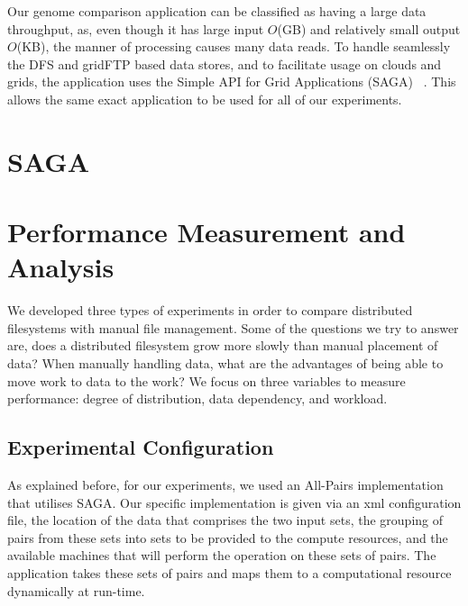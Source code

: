 \documentclass{rspublic}
\newcommand{\micnote}[1]{ {\textcolor{blue} { ***Michael: #1 }}} \else
\newcommand{\jhanote}[1]{} \newcommand{\micnote}[1]{} \newcommand{\fixme}[1]{}
\begin{document}

Our genome comparison application can be classified as having a large
data throughput, as, even though it
has large input $O$(GB) and relatively small output $O$(KB), the manner of 
processing causes many data reads.  To
handle seamlessly the DFS and gridFTP based data stores, and to 
facilitate usage on clouds and grids, the application
uses the Simple API for Grid Applications (SAGA) ~\citep{saga_web}.
This allows the same exact application to be used for all of our
experiments.  

\section{SAGA} \label{Sec:SAGA}

\section{Performance Measurement and Analysis} 
We developed three types
of experiments in order to compare distributed filesystems with manual
file management.  Some of the questions we try to answer are, 
does a distributed filesystem grow more slowly than
manual placement of data?  When manually handling data, what are the
advantages of being able to move work to data to the work?  
We focus on three variables to measure performance:  degree of distribution, data
dependency, and workload.

\subsection{Experimental Configuration}

As explained before, for our experiments, we used an All-Pairs
 implementation that utilises SAGA. Our specific
implementation is given via an xml configuration file, the location of
the data that comprises the two input sets, the grouping of pairs from
these sets into sets to be provided to the compute resources, and the
available machines that will perform the operation on these sets of
pairs.  The application takes these sets of pairs and maps them to a
computational resource dynamically at run-time.
\end{document}
